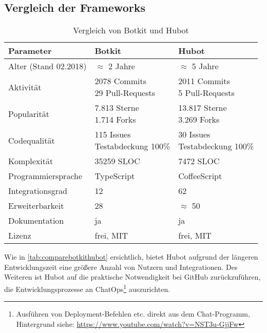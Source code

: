 \subsection{Vergleich der Frameworks}


\begin{table}[htbp]
    \centering
    \begin{tabularx}{\textwidth}{|l|X|X|}
        \hline
        \textbf{Parameter} & \textbf{Botkit} & \textbf{Hubot} \\
        \hline
        Alter (Stand 02.2018) & $\approx$ 2 Jahre & $\approx$ 5 Jahre \\
        \hline
        Aktivität & \makecell[l]{2078 Commits\\ 29 Pull-Requests} & \makecell[l]{2011 Commits\\ 5 Pull-Requests} \\
        \hline
        Popularität & \makecell[l]{7.813 Sterne\\ 1.714 Forks} & \makecell[l]{13.817 Sterne\\ 3.269 Forks} \\
        \hline
        Codequalität & \makecell[l]{115 Issues\\ Testabdeckung 100\%} & \makecell[l]{30 Issues\\ Testabdeckung 100\%} \\
        \hline
        Komplexität & 35259 SLOC & 7472 SLOC \\
        \hline
        Programmiersprache & TypeScript & CoffeeScript \\
        \hline
        Integrationsgrad & 12 & 62 \\
        \hline
        Erweiterbarkeit & 28 & $\approx$ 50 \\
        \hline
        Dokumentation & ja & ja \\
        \hline
        Lizenz & frei, MIT & frei, MIT \\
        \hline
    \end{tabularx}
    \caption{Vergleich von Botkit und Hubot}
    \label{tab:comparebotkithubot}
\end{table}


Wie in \autoref{tab:comparebotkithubot} ersichtlich, bietet Hubot aufgrund der längeren Entwicklungszeit eine größere Anzahl von Nutzern und Integrationen. Des Weiteren ist Hubot auf die praktische Notwendigkeit bei GitHub zurückzuführen, die Entwicklungsprozesse an ChatOps\footnote{Ausführen von Deployment-Befehlen etc. direkt aus dem Chat-Programm, Hintergrund siehe: \url{https://www.youtube.com/watch?v=NST3u-GjjFw}} auszurichten.

